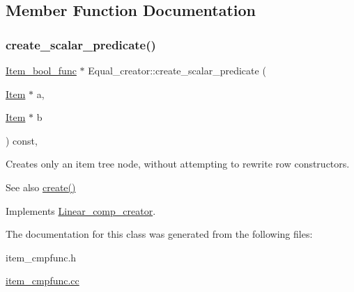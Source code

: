 \subsection{Member Function Documentation}
\mbox{\label{classEqual__creator_adce84c4bb7f90dd0aca3c2a0c4dd6f35}} 
\subsubsection{\texorpdfstring{create\+\_\+scalar\+\_\+predicate()}{create\_scalar\_predicate()}}
{\footnotesize\ttfamily \mbox{\hyperlink{classItem__bool__func}{Item\+\_\+bool\+\_\+func}} $\ast$ Equal\+\_\+creator\+::create\+\_\+scalar\+\_\+predicate (\begin{DoxyParamCaption}\item[{\mbox{\hyperlink{classItem}{Item}} $\ast$}]{a,  }\item[{\mbox{\hyperlink{classItem}{Item}} $\ast$}]{b }\end{DoxyParamCaption}) const\hspace{0.3cm}{\ttfamily [protected]}, {\ttfamily [virtual]}}

Creates only an item tree node, without attempting to rewrite row constructors. \begin{DoxySeeAlso}{See also}
\mbox{\hyperlink{classLinear__comp__creator_abf8d17944a06f0f90a187f4d99e06319}{create()}} 
\end{DoxySeeAlso}


Implements \mbox{\hyperlink{classLinear__comp__creator_ad77c92f078a60d9026d394fa55d80a49}{Linear\+\_\+comp\+\_\+creator}}.



The documentation for this class was generated from the following files\+:\begin{DoxyCompactItemize}
\item 
item\+\_\+cmpfunc.\+h\item 
\mbox{\hyperlink{item__cmpfunc_8cc}{item\+\_\+cmpfunc.\+cc}}\end{DoxyCompactItemize}
